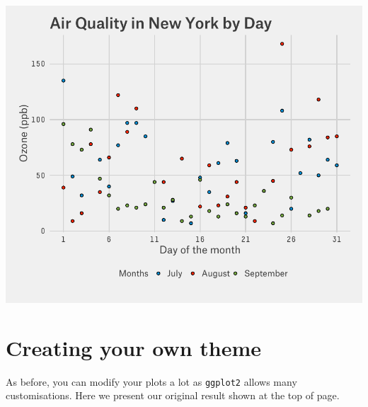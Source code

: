 \documentclass[]{article}
\begin{document}
\begin{center}\includegraphics{5_Scatter_Plots_pdf/scatter_15-1} \end{center}

\section{Creating your own theme}\label{creating-your-own-theme}

As before, you can modify your plots a lot as \texttt{ggplot2} allows
many customisations. Here we present our original result shown at the
top of page.
\end{document}
